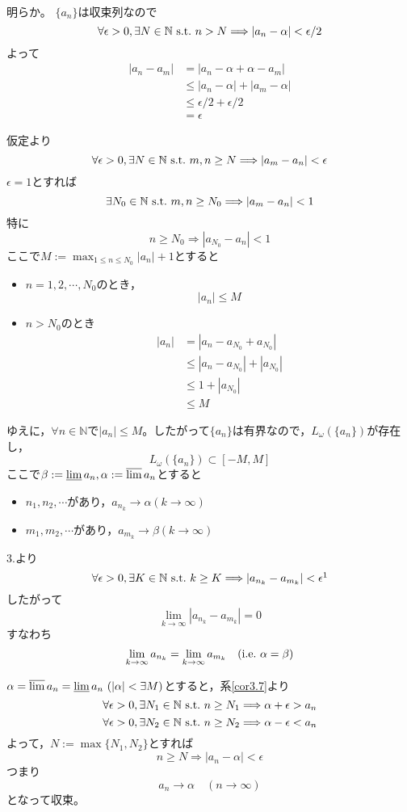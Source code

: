 \documentclass[dvipdfmx,a4j,10pt]{jsarticle}
\makeatletter
\theoremstyle{mystyle1}
\theoremstyle{mystyle2}
\renewenvironment{proof}[1][\proofname]{\par
  \pushQED{\qed}%
  \normalfont
  \topsep6\p@\@plus6\p@ \trivlist
  \item[\hskip\labelsep{\bfseries\sffamily #1}]\ignorespaces
}{%
  \popQED\endtrivlist\@endpefalse
}
\renewcommand\proofname{証明}
\makeatother
\begin{document}
\begin{proof}[定理\ref{thm3.8}の証明]\

\noindent{}
明らか。
$\{a_n\}$は収束列なので
\[\forall\epsilon>0,\exists N\in\mathbb{N}\ {\rm s.t.}\ n>N\Longrightarrow |a_n-\alpha|<\epsilon/2\]
よって
\[
\begin{split}
	|a_n-a_m|&=|a_n-\alpha+\alpha-a_m|\\
	&\leq|a_n-\alpha|+|a_m-\alpha|\\
	&\leq \epsilon/2+\epsilon/2\\
	&=\epsilon
\end{split}
\]

\noindent{}
仮定より
\[\forall\epsilon>0,\exists N\in\mathbb{N}\ {\rm s.t.}\ m,n\geq N\Longrightarrow |a_m-a_n|<\epsilon\]
$\epsilon=1$とすれば
\[\exists N_0\in\mathbb{N}\ {\rm s.t.}\ m,n\geq N_0\Longrightarrow |a_m-a_n|<1\]
特に
\[n\geq N_0\Longrightarrow |a_{N_0}-a_n|<1\]
ここで$\displaystyle M:=\max_{1\leq n \leq N_0}|a_n|+1$とすると
\begin{itemize}
\item $n=1,2,\cdots,N_0$のとき，
\[|a_n|\leq M\]
\item $n>N_0$のとき
\[
\begin{split}
|a_n|&=|a_n-a_{N_0}+a_{N_0}|\\
&\leq |a_n-a_{N_0}|+|a_{N_0}|\\
&\leq 1+|a_{N_0}|\\
&\leq M
\end{split}
\]
\end{itemize}
ゆえに，$\forall n\in\mathbb{N}$で$|a_n|\leq M$。したがって$\{a_n\}$は有界なので，$L_\omega(\{a_n\})$が存在し，
\[L_\omega(\{a_n\})\subset[-M,M]\]
ここで$\beta:=\varliminf a_n,\alpha:=\varlimsup a_n$とすると
\begin{itemize}
\item $n_1,n_2,\cdots$があり，$a_{n_k}\to\alpha(k\to\infty)$
\item $m_1,m_2,\cdots$があり，$a_{m_k}\to\beta(k\to\infty)$
\end{itemize}
3.より
\[\forall\epsilon>0,\exists K\in\mathbb{N}\ {\rm s.t.}\ k\geq K\Longrightarrow |a_{n_k}-a_{m_k}|<\epsilon\footnotemark \]
したがって
\[\lim_{k\to\infty}|a_{n_k}-a_{m_k}|=0\]
すなわち
\[\lim_{k\to\infty} a_{n_k}=\lim_{k\to\infty}a_{m_k}\quad({\rm i.e.}\ \alpha=\beta)\]

\noindent{}
$\alpha=\varlimsup a_n=\varliminf a_n\ (|\alpha|<\exists M)$とすると，系\ref{cor3.7}より
\[\forall\epsilon>0,\exists N_1\in\mathbb{N}\ {\rm s.t.}\ n\geq N_1\Longrightarrow \alpha+\epsilon>a_n\]
\[\forall\epsilon>0,\exists N_2\in\mathbb{N}\ {\rm s.t.}\ n\geq N_2\Longrightarrow \alpha-\epsilon<a_n\]
よって，$N:=\max\{N_1,N_2\}$とすれば
\[n\geq N\Longrightarrow |a_n-\alpha|<\epsilon\]
つまり
\[a_n\to\alpha\quad(n\to\infty)\]
となって収束。
\end{proof}
\end{document}
